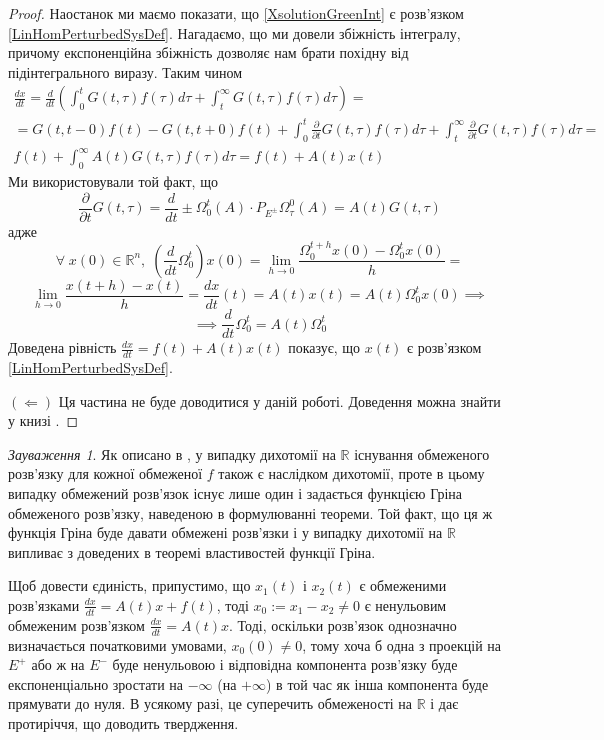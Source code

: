 \documentclass[14pt]{extarticle} %
\let\oldforall\forall
\renewcommand{\forall}{\oldforall\;}
\theoremstyle{remark}
\newtheorem{remark}{Зауваження}
\begin{document}
\begin{proof}
	Наостанок ми маємо показати, що \ref{XsolutionGreenInt} є розв’язком \ref{LinHomPerturbedSysDef}. Нагадаємо, що ми довели збіжність
	інтегралу, причому експоненційна збіжність дозволяє нам брати похідну від підінтегрального виразу. Таким чином
	\begin{gather*}
		\frac{dx}{dt}=\frac{d}{dt}(\int_0^tG(t,\tau)f(\tau)d\tau+\int_t^{\infty}G(t,\tau)f(\tau)d\tau)=\\
		=G(t,t-0)f(t)-G(t,t+0)f(t)+\int_0^t\frac{\partial}{\partial t}G(t,\tau)f(\tau)d\tau+
		\int_t^{\infty}\frac{\partial}{\partial t}G(t,\tau)f(\tau)d\tau=\\
		f(t)+\int_0^{\infty}A(t)G(t,\tau)f(\tau)d\tau=f(t)+A(t)x(t)
	\end{gather*}
	Ми використовували той факт, що
	\[\frac{\partial}{\partial t}G(t,\tau)=\frac{d}{d t}\pm\Omega_0^t(A)\cdot P_{E^{\pm}}\Omega_{\tau}^0(A)=A(t)G(t,\tau)\]
	адже \[\forall x(0)\in\mathbb{R}^n,\;(\frac{d}{dt}\Omega_0^t)x(0)=\lim_{h\to 0}\frac{\Omega_0^{t+h}x(0)-\Omega_0^tx(0)}{h}=\]
	\[\lim_{h\to 0}\frac{x(t+h)-x(t)}{h}=\frac{dx}{dt}(t)=A(t)x(t)=A(t)\Omega_0^tx(0)\implies\]
	\[\implies\frac{d}{dt}\Omega_0^t=A(t)\Omega_0^t\]
	Доведена рівність $\frac{dx}{dt}=f(t)+A(t)x(t)$ показує, що $x(t)$ є розв’язком \ref{LinHomPerturbedSysDef}.

	$(\Longleftarrow)$ Ця частина не буде доводитися у даній роботі. Доведення можна знайти у книзі \cite{krein}.
\end{proof}
\begin{remark}
	Як описано в \cite{mitrop},
	у випадку дихотомії на $\mathbb{R}$ існування обмеженого розв’язку для кожної обмеженої $f$ також є наслідком дихотомії, проте в цьому 
	випадку обмежений розв’язок існує лише один і задається функцією Гріна обмеженого розв’язку, наведеною в формулюванні теореми. Той факт,
	що ця ж функція Гріна буде давати обмежені розв’язки і у випадку дихотомії на $\mathbb{R}$ випливає з доведених в теоремі
	властивостей функції Гріна.

	Щоб довести єдиність, припустимо, що $x_1(t)$ і $x_2(t)$ є обмеженими розв’язками $\frac{dx}{dt}=A(t)x+f(t)$, тоді
	$x_0:=x_1-x_2\neq 0$ є ненульовим обмеженим розв’язком $\frac{dx}{dt}=A(t)x$. Тоді, оскільки розв’язок однозначно визначається
	початковими умовами, $x_0(0)\neq 0$, тому хоча б одна з проекцій на $E^+$ або ж на $E^-$ буде ненульовою і відповідна компонента
	розв’язку буде експоненціально зростати на $-\infty$ (на $+\infty$) в той час як інша компонента буде прямувати до нуля. В усякому разі,
	це суперечить обмеженості на $\mathbb{R}$ і дає протиріччя, що доводить твердження.
\end{remark}
\end{document}
